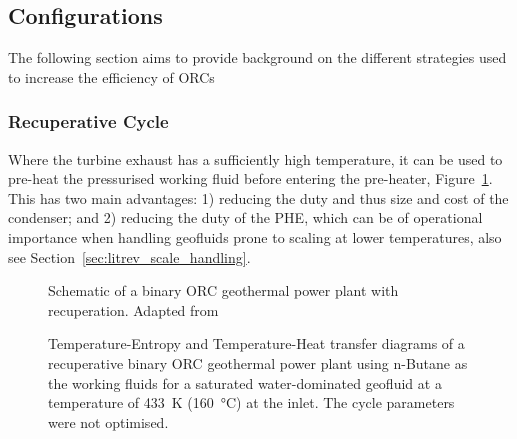    \subsection{Configurations}
        The following section aims to provide background on the different strategies used to increase the efficiency of \ac{ORC}s

        \subsubsection{Recuperative Cycle}
            Where the turbine exhaust has a sufficiently high temperature, it can be used to pre-heat the pressurised working fluid before entering the pre-heater, Figure~\ref{fig:litrev_ORC_recu_schematic}. This has two main advantages: 1) reducing the duty and thus size and cost of the condenser; and 2) reducing the duty of the \ac{PHE}, which can be of operational importance when handling geofluids prone to scaling at lower temperatures, also see Section~\ref{sec:litrev_scale_handling}.

             \begin{figure}[H]
                \centering
                
                \caption[Schematic of a binary ORC geothermal power plant with recuperation.]{Schematic of a binary ORC geothermal power plant with recuperation. Adapted from \cite{DiPippo2016}}
                \label{fig:litrev_ORC_recu_schematic}
            \end{figure}
    
             \begin{figure}[H]
                \centering
                
                \caption[TS and TQ diagrams of a recuperative binary \ac{ORC} using n-Butane as the working fluid.]{Temperature-Entropy and Temperature-Heat transfer diagrams of a recuperative binary \ac{ORC} geothermal power plant using n-Butane as the working fluids for a saturated water-dominated geofluid at a temperature of \qty{433}{\K} (\qty{160}{\degreeCelsius}) at the inlet. The cycle parameters were not optimised.}
                \label{fig:litrev_ORC_recu_TS}
            \end{figure}
    

